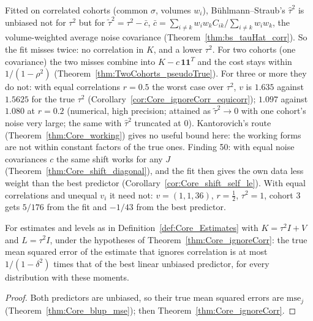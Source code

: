 \begin{remark}\label{rem:pseudoTrue}
  Fitted on correlated cohorts (common $\sigma$, volumes $w_i$), Bühlmann--Straub's $\hat\tau^2$
  is unbiased not for $\tau^2$ but for $\tilde\tau^2 = \tau^2 - \bar c$,
  $\bar c = \sum_{i\ne k} w_iw_kC_{ik}/\sum_{i\ne k}w_iw_k$, the volume-weighted average noise
  covariance (Theorem~\ref{thm:bs_tauHat_corr}). So the fit misses twice: no correlation in $K$, and a lower $\tau^2$. For two
  cohorts (one covariance) the two misses combine into $K - c\,\mathbf 1\mathbf 1^T$ and the
  cost stays within $1/(1-\rho^2)$ (Theorem~\ref{thm:TwoCohorts_pseudoTrue}). For three or
  more they do not: with equal correlations $r = 0.5$ the worst case over $\tau^2$, $v$ is
  $1.635$ against $1.5625$ for the true $\tau^2$ (Corollary~\ref{cor:Core_ignoreCorr_equicorr});
  $1.097$ against $1.080$ at $r = 0.2$ (numerical, high precision; attained as
  $\tilde\tau^2 \to 0$ with one cohort's noise very large; the same with $\hat\tau^2$
  truncated at $0$). Kantorovich's route (Theorem~\ref{thm:Core_working}) gives no useful
  bound here: the working forms are not within constant factors of the true ones.
  Finding 50: with equal noise covariances $c$ the same shift works for any $J$
  (Theorem~\ref{thm:Core_shift_diagonal}), and the fit then gives the own data less weight than
  the best predictor (Corollary~\ref{cor:Core_shift_self_le}). With equal correlations and unequal
  $v_i$ it need not: $v = (1, 1, 36)$, $r = \tfrac12$, $\tau^2 = 1$, cohort 3 gets $5/176$ from the
  fit and $-1/43$ from the best predictor.
\end{remark}

\begin{theorem}\label{thm:Core_ignoreCorr_mse}
  \leanok
  For estimates and levels as in Definition~\ref{def:Core_Estimates} with $K = \tau^2I + V$
  and $L = \tau^2I$, under the hypotheses of Theorem~\ref{thm:Core_ignoreCorr}: the true
  mean squared error of the estimate that ignores correlation is at most $1/(1-\delta^2)$
  times that of the best linear unbiased predictor, for every distribution with these
  moments.
\end{theorem}
\begin{proof}
  \leanok
  Both predictors are unbiased, so their true mean squared errors are $\mathrm{mse}_j$
  (Theorem~\ref{thm:Core_blup_mse}); then Theorem~\ref{thm:Core_ignoreCorr}.
\end{proof}

